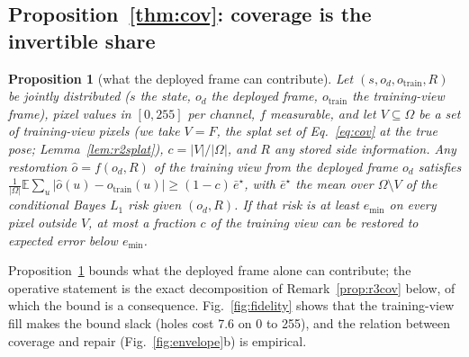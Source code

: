 \documentclass{article}
\newtheorem{proposition}{Proposition}
\begin{document}
\subsection{Proposition~\ref{thm:cov}: coverage is the invertible share}
\label{app:covproof}

\begin{proposition}[what the deployed frame can contribute]
\label{prop:cov}
Let $(s, o_d, o_{\mathrm{train}}, R)$ be jointly distributed ($s$ the state, $o_d$ the deployed frame,
$o_{\mathrm{train}}$ the training-view frame), pixel values in $[0,255]$ per channel, $f$ measurable, and let $V
\subseteq \Omega$ be a set of training-view pixels (we take $V = F$, the splat set of Eq.~\ref{eq:cov} at the
true pose; Lemma~\ref{lem:r2splat}), $c = |V|/|\Omega|$, and $R$ any stored side information. Any restoration $\hat o =
f(o_d, R)$ of the training view from the deployed frame $o_d$ satisfies $\frac{1}{|\Omega|}\mathbb{E}\sum_{u}|\hat o(u)
- o_{\mathrm{train}}(u)| \ge (1-c)\,\bar e^\star$, with $\bar e^\star$ the mean over $\Omega \setminus V$ of the
conditional Bayes $L_1$ risk given $(o_d, R)$. If that risk is at least $e_{\min}$ on every pixel outside $V$, at most a
fraction $c$ of the training view can be restored to expected error below $e_{\min}$.
\end{proposition}
Proposition~\ref{prop:cov} bounds what the deployed frame alone can contribute; the operative statement is the exact
decomposition of Remark~\ref{prop:r3cov} below, of which the bound is a consequence. Fig.~\ref{fig:fidelity} shows that the
training-view fill makes the bound slack (holes cost 7.6 on 0 to 255), and the relation between coverage and repair
(Fig.~\ref{fig:envelope}b) is empirical.
\end{document}
